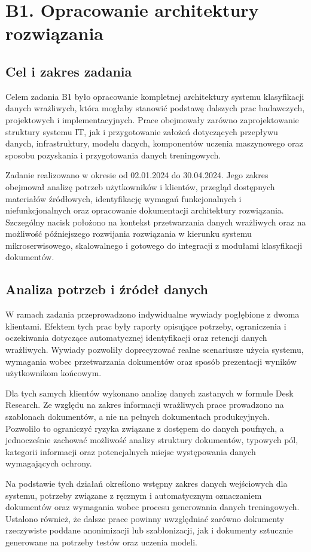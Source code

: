 \documentclass[12pt,a4paper]{report}
\begin{document}
\section{B1. Opracowanie architektury rozwiązania}
\subsection{Cel i zakres zadania}
Celem zadania B1 było opracowanie kompletnej architektury systemu klasyfikacji danych wrażliwych, która mogłaby stanowić podstawę dalszych prac badawczych, projektowych i implementacyjnych. Prace obejmowały zarówno zaprojektowanie struktury systemu IT, jak i przygotowanie założeń dotyczących przepływu danych, infrastruktury, modelu danych, komponentów uczenia maszynowego oraz sposobu pozyskania i przygotowania danych treningowych.

Zadanie realizowano w okresie od 02.01.2024 do 30.04.2024. Jego zakres obejmował analizę potrzeb użytkowników i klientów, przegląd dostępnych materiałów źródłowych, identyfikację wymagań funkcjonalnych i niefunkcjonalnych oraz opracowanie dokumentacji architektury rozwiązania. Szczególny nacisk położono na kontekst przetwarzania danych wrażliwych oraz na możliwość późniejszego rozwijania rozwiązania w kierunku systemu mikroserwisowego, skalowalnego i gotowego do integracji z modułami klasyfikacji dokumentów.

\subsection{Analiza potrzeb i źródeł danych}
W ramach zadania przeprowadzono indywidualne wywiady pogłębione z dwoma klientami. Efektem tych prac były raporty opisujące potrzeby, ograniczenia i oczekiwania dotyczące automatycznej identyfikacji oraz retencji danych wrażliwych. Wywiady pozwoliły doprecyzować realne scenariusze użycia systemu, wymagania wobec przetwarzania dokumentów oraz sposób prezentacji wyników użytkownikom końcowym.

Dla tych samych klientów wykonano analizę danych zastanych w formule Desk Research. Ze względu na zakres informacji wrażliwych prace prowadzono na szablonach dokumentów, a nie na pełnych dokumentach produkcyjnych. Pozwoliło to ograniczyć ryzyka związane z dostępem do danych poufnych, a jednocześnie zachować możliwość analizy struktury dokumentów, typowych pól, kategorii informacji oraz potencjalnych miejsc występowania danych wymagających ochrony.

Na podstawie tych działań określono wstępny zakres danych wejściowych dla systemu, potrzeby związane z ręcznym i automatycznym oznaczaniem dokumentów oraz wymagania wobec procesu generowania danych treningowych. Ustalono również, że dalsze prace powinny uwzględniać zarówno dokumenty rzeczywiste poddane anonimizacji lub szablonizacji, jak i dokumenty sztucznie generowane na potrzeby testów oraz uczenia modeli.
\end{document}
